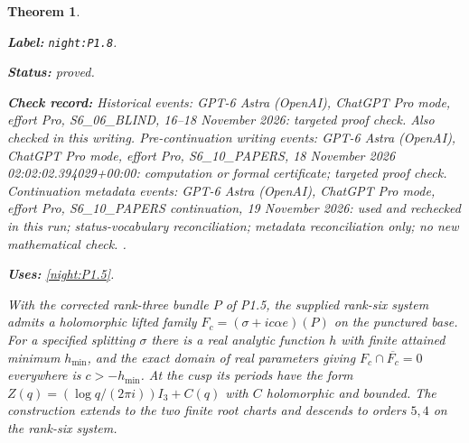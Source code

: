 \documentclass[11pt,a4paper]{article}
\newtheorem{theorem}{Theorem}[section]
\theoremstyle{definition}
\newcommand{\StatementRecord}[4]{\par\smallskip\begingroup\upshape\raggedright\noindent\textbf{Label:} \nolinkurl{#1}.\par\noindent\textbf{Status:} #2.\par\noindent\textbf{Check record:} #3.\par\noindent\textbf{Uses:} #4.\par\endgroup\smallskip}
\begin{document}
\begin{theorem}\label{night:P1.8}
\StatementRecord{night:P1.8}{proved}{Historical events: GPT-6 Astra (OpenAI), ChatGPT Pro mode, effort Pro, S6\_06\_BLIND, 16--18 November 2026: targeted proof check. Also checked in this writing. Pre-continuation writing events: GPT-6 Astra (OpenAI), ChatGPT Pro mode, effort Pro, S6\_10\_PAPERS, 18 November 2026 02:02:02.394029+00:00: computation or formal certificate; targeted proof check. Continuation metadata events: GPT-6 Astra (OpenAI), ChatGPT Pro mode, effort Pro, S6\_10\_PAPERS continuation, 19 November 2026: used and rechecked in this run; status-vocabulary reconciliation; metadata reconciliation only; no new mathematical check. }{\cref{night:P1.5}}
With the corrected rank-three bundle $P$ of P1.5, the supplied rank-six
system admits a holomorphic lifted family
$F_c=(\sigma+ic\alpha e)(P)$ on the punctured base.
For a specified splitting $\sigma$ there is a real analytic function
$h$ with finite attained minimum $h_{\min}$, and the exact domain of
real parameters giving $F_c\cap\overline{F_c}=0$ everywhere is
$c>-h_{\min}$.
At the cusp its periods have the form
$Z(q)=(\log q/(2\pi i))I_3+C(q)$ with $C$ holomorphic and bounded.
The construction extends to the two finite root charts and descends to
orders $5,4$ on the rank-six system.
\end{theorem}
\end{document}
